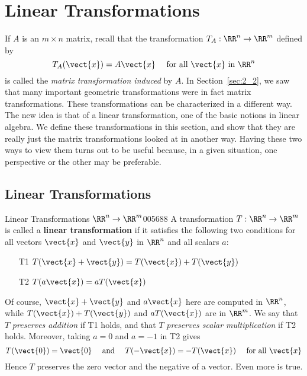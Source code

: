 \section{Linear Transformations}
\label{sec:2_6}

If $A$ is an $m \times n$ matrix, recall that the transformation $T_{A} : \RR^n \to \RR^m$ defined by
\begin{equation*}
T_{A}(\vect{x}) = A\vect{x} \quad \mbox{ for all } \vect{x} \mbox{ in } \RR^n
\end{equation*}
is called the \textit{matrix transformation induced} by $A$. In Section~\ref{sec:2_2}, we saw that many important geometric transformations were in fact matrix transformations. These transformations can be characterized in a different way. The new idea is that of a linear transformation, one of the basic notions in linear algebra. We define these transformations in this section, and show that they are really just the matrix transformations looked at in another way. Having these two ways to view them turns out to be useful because, in a given situation, one perspective or the other may be preferable.

\subsection*{Linear Transformations}

\begin{definition}{Linear Transformations $\RR^n \to \RR^m$}{005688}
A transformation $T : \RR^n \to \RR^m$ is called a \textbf{linear transformation} if it satisfies the following two conditions for all vectors $\vect{x}$ and $\vect{y}$ in $\RR^n$ and all scalars $a$:
\begin{enumerate}
\item[T1] \quad $T(\vect{x} + \vect{y}) = T(\vect{x}) + T(\vect{y})$
\item[T2] \quad $T(a\vect{x}) = aT(\vect{x})$
\end{enumerate}
\end{definition}

\noindent Of course, $\vect{x} + \vect{y}$ and $a\vect{x}$ here are computed in $\RR^n$, while $T(\vect{x}) + T(\vect{y})$ and $aT(\vect{x})$ are in $\RR^m$. We say that $T$ \textit{preserves addition} if T1 holds, and that $T$ \textit{preserves scalar multiplication} if T2 holds. Moreover, taking $a = 0$ and $a = -1$ in T2 gives
\begin{equation*}
T(\vect{0}) = \vect{0} \quad \mbox{ and } \quad T(-\vect{x}) = -T(\vect{x}) \quad  \mbox{ for all } \vect{x}
\end{equation*}
Hence $T$ preserves the zero vector and the negative of a vector. Even more is true.

